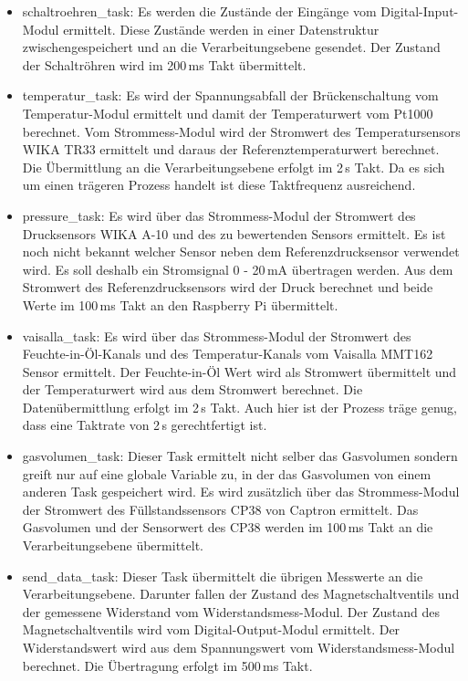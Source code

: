 \begin{itemize}
\itemsep0em
	\item schaltroehren\_task: Es werden die Zustände der Eingänge vom Digital-Input-Modul ermittelt. Diese Zustände werden in einer Datenstruktur zwischengespeichert und an die Verarbeitungsebene gesendet. Der Zustand der Schaltröhren wird  im 200\,ms Takt übermittelt.
	
	\item temperatur\_task: Es wird der Spannungsabfall der Brückenschaltung vom Temperatur-Modul ermittelt und damit der Temperaturwert vom Pt1000 berechnet. Vom Strommess-Modul wird der Stromwert des Temperatursensors WIKA TR33 ermittelt und daraus der Referenztemperaturwert berechnet. Die Übermittlung an die Verarbeitungsebene erfolgt im 2\,s Takt. Da es sich um einen trägeren Prozess handelt ist diese Taktfrequenz ausreichend.
	
	\item pressure\_task: Es wird über das Strommess-Modul der Stromwert des Drucksensors WIKA A-10 und des zu bewertenden Sensors ermittelt. Es ist noch nicht bekannt welcher Sensor neben dem Referenzdrucksensor verwendet wird. Es soll deshalb ein Stromsignal 0 - 20\,mA übertragen werden. Aus dem Stromwert des Referenzdrucksensors wird der Druck berechnet und beide Werte im 100\,ms Takt an den Raspberry Pi übermittelt.
	
	\item vaisalla\_task: Es wird über das Strommess-Modul der Stromwert des Feuchte-in-Öl-Kanals und des Temperatur-Kanals vom Vaisalla MMT162 Sensor ermittelt. Der Feuchte-in-Öl Wert wird als Stromwert übermittelt und der Temperaturwert wird aus dem Stromwert berechnet. Die Datenübermittlung erfolgt im 2\,s Takt. Auch hier ist der Prozess träge genug, dass eine Taktrate von 2\,s gerechtfertigt ist.
	
	\item gasvolumen\_task: Dieser Task ermittelt nicht selber das Gasvolumen sondern greift nur auf eine globale Variable zu, in der das Gasvolumen von einem anderen Task gespeichert wird. Es wird zusätzlich über das Strommess-Modul der Stromwert des Füllstandssensors CP38 von Captron ermittelt. Das Gasvolumen und der Sensorwert des CP38 werden im 100\,ms Takt an die Verarbeitungsebene übermittelt.
	
	\item send\_data\_task: Dieser Task übermittelt die übrigen Messwerte an die Verarbeitungsebene. Darunter fallen der Zustand des Magnetschaltventils und der gemessene Widerstand vom Widerstandsmess-Modul. Der Zustand des Magnetschaltventils wird vom Digital-Output-Modul ermittelt. Der Widerstandswert wird aus dem Spannungswert vom Widerstandsmess-Modul berechnet. Die Übertragung erfolgt im 500\,ms Takt.
	

\end{itemize}

